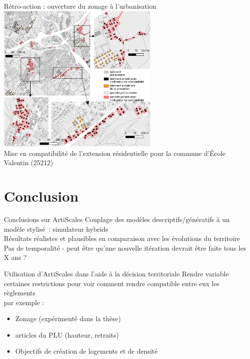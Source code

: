 \documentclass[xcolor=table]{beamer}
\begin{document}
\begin{frame}{Rétro-action : ouverture du zonage à l'urbanisation}
		\includegraphics[width=8cm]{Images/ecoleVal.png}
\\
		\tiny{Mise en compatibilité de l'extension résidentielle pour la commune d'École Valentin (25212)}
\end{frame}

\section{Conclusion}

\begin{frame}{Conclusions sur ArtiScales}
	Couplage des modèles descriptifs/génératifs à un modèle stylisé~: simulateur hybride
	\\
	Résultats réalistes et plausibles en comparaison avec les évolutions du territoire
	\\
	Pas de temporalité - peut être qu'une nouvelle itération devrait être faite tous les X ans ? %
	\\
\end{frame}


\begin{frame}{Utilisation d'ArtiScales dans l'aide à la décision territoriale}
	Rendre variable certaines restrictions pour voir comment rendre compatible entre eux les règlements
	\\
	par exemple : 
	\begin{itemize}
		\item Zonage (expérimenté dans la thèse)
		\item articles du PLU (hauteur, retraits)
		\item Objectifs de création de logements et de densité
	\end{itemize}
\end{frame}
\end{document}
